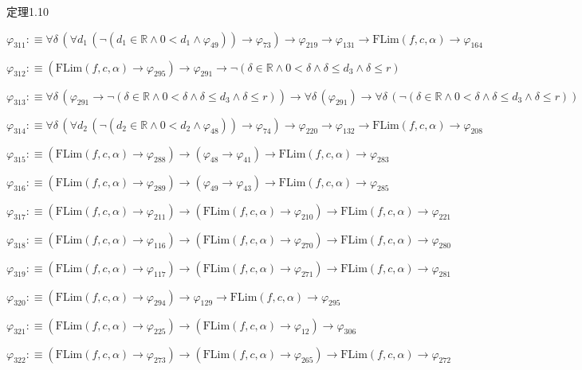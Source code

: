 \begin{fullproof}{定理1.10}
\begin{abbrevlist}
\item $\varphi_{311} :\equiv \forall \delta\,(\forall d_{1}\,(\neg (d_{1} \in \mathbb{R} \land 0 < d_{1} \land \varphi_{49})) \to \varphi_{73}) \to \varphi_{219} \to \varphi_{131} \to \mathrm{FLim}(f,c,\alpha) \to \varphi_{164}$
\item $\varphi_{312} :\equiv (\mathrm{FLim}(f,c,\alpha) \to \varphi_{295}) \to \varphi_{291} \to \neg (\delta \in \mathbb{R} \land 0 < \delta \land \delta \leq d_{3} \land \delta \leq r)$
\item $\varphi_{313} :\equiv \forall \delta\,(\varphi_{291} \to \neg (\delta \in \mathbb{R} \land 0 < \delta \land \delta \leq d_{3} \land \delta \leq r)) \to \forall \delta\,(\varphi_{291}) \to \forall \delta\,(\neg (\delta \in \mathbb{R} \land 0 < \delta \land \delta \leq d_{3} \land \delta \leq r))$
\item $\varphi_{314} :\equiv \forall \delta\,(\forall d_{2}\,(\neg (d_{2} \in \mathbb{R} \land 0 < d_{2} \land \varphi_{48})) \to \varphi_{74}) \to \varphi_{220} \to \varphi_{132} \to \mathrm{FLim}(f,c,\alpha) \to \varphi_{208}$
\item $\varphi_{315} :\equiv (\mathrm{FLim}(f,c,\alpha) \to \varphi_{288}) \to (\varphi_{48} \to \varphi_{41}) \to \mathrm{FLim}(f,c,\alpha) \to \varphi_{283}$
\item $\varphi_{316} :\equiv (\mathrm{FLim}(f,c,\alpha) \to \varphi_{289}) \to (\varphi_{49} \to \varphi_{43}) \to \mathrm{FLim}(f,c,\alpha) \to \varphi_{285}$
\item $\varphi_{317} :\equiv (\mathrm{FLim}(f,c,\alpha) \to \varphi_{211}) \to (\mathrm{FLim}(f,c,\alpha) \to \varphi_{210}) \to \mathrm{FLim}(f,c,\alpha) \to \varphi_{221}$
\item $\varphi_{318} :\equiv (\mathrm{FLim}(f,c,\alpha) \to \varphi_{116}) \to (\mathrm{FLim}(f,c,\alpha) \to \varphi_{270}) \to \mathrm{FLim}(f,c,\alpha) \to \varphi_{280}$
\item $\varphi_{319} :\equiv (\mathrm{FLim}(f,c,\alpha) \to \varphi_{117}) \to (\mathrm{FLim}(f,c,\alpha) \to \varphi_{271}) \to \mathrm{FLim}(f,c,\alpha) \to \varphi_{281}$
\item $\varphi_{320} :\equiv (\mathrm{FLim}(f,c,\alpha) \to \varphi_{294}) \to \varphi_{129} \to \mathrm{FLim}(f,c,\alpha) \to \varphi_{295}$
\item $\varphi_{321} :\equiv (\mathrm{FLim}(f,c,\alpha) \to \varphi_{225}) \to (\mathrm{FLim}(f,c,\alpha) \to \varphi_{12}) \to \varphi_{306}$
\item $\varphi_{322} :\equiv (\mathrm{FLim}(f,c,\alpha) \to \varphi_{273}) \to (\mathrm{FLim}(f,c,\alpha) \to \varphi_{265}) \to \mathrm{FLim}(f,c,\alpha) \to \varphi_{272}$

\end{abbrevlist}
\end{fullproof}
